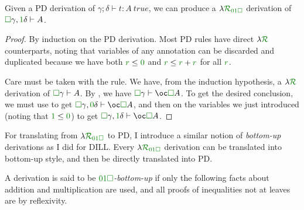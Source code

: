 \begin{proposition}[PD $\to$ \name]
  Given a PD derivation of $\gamma; \delta \vdash t : A~\mathit{true}$, we can
  produce a $\name_{\instPD}$ derivation of
  $\valid\gamma, \true\delta \vdash A$.
\end{proposition}
\begin{proof}
  By induction on the PD derivation.
  Most PD rules have direct $\name$ counterparts, noting that variables of any
  annotation can be discarded and duplicated because we have both
  $\gr r \leq \gr 0$ and
  $\gr r \leq \gr r + \gr r$ for all
  $\gr r$.

  Care must be taken with the  rule.
  We have, from the induction hypothesis, a $\name$ derivation of
  $\gr\Box\gamma \vdash A$.
  By , we have
  $\gr\Box\gamma \vdash \oc\valid A$.
  To get the desired conclusion, we must use  to get
  $\gr\Box\gamma, \gr\unused\delta \vdash \oc\valid A$, and
  then  on the variables we just introduced (noting that
  $\true \leq \unused$) to get
  $\gr\Box\gamma, \gr\true\delta \vdash \oc\valid A$.
\end{proof}

For translating from $\name_{\instPD}$ to PD, I introduce a similar notion of
\emph{bottom-up} derivations as I did for DILL\@.
Every $\name_{\instPD}$ derivation can be translated into bottom-up style, and
then be directly translated into PD\@.

\begin{definition}
  A derivation is said to be \emph{$\instPD$-bottom-up} if only the following
  facts about addition and multiplication are used, and all proofs of
  inequalities not at leaves are by reflexivity.

\end{definition}

